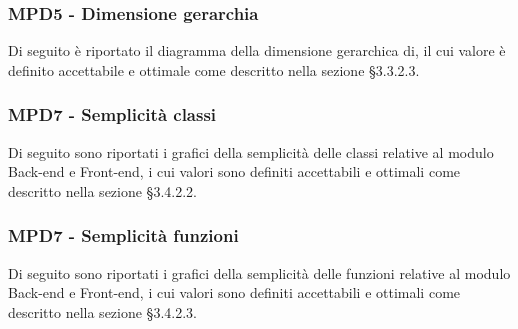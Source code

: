 \subsubsection{MPD5 - Dimensione gerarchia}
Di seguito è riportato il diagramma della dimensione gerarchica di, il cui valore è definito accettabile e ottimale come descritto nella sezione §3.3.2.3.\\

\subsubsection{MPD7 - Semplicità classi}
Di seguito sono riportati i grafici della semplicità delle classi relative al modulo Back-end e Front-end, i cui valori sono definiti accettabili e ottimali come descritto nella sezione §3.4.2.2.\\

\subsubsection{MPD7 - Semplicità funzioni}
Di seguito sono riportati i grafici della semplicità delle funzioni relative al modulo Back-end e Front-end, i cui valori sono definiti accettabili e ottimali come descritto nella sezione §3.4.2.3.\\

